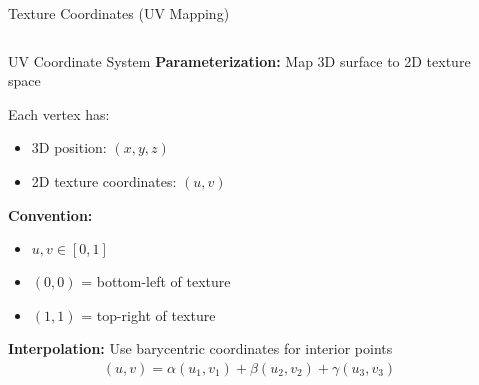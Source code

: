 \begin{frame}{Texture Coordinates (UV Mapping)}
  \begin{columns}
    \begin{column}{0.7\textwidth}
      \begin{mathbox}{UV Coordinate System}
        \footnotesize
        \textbf{Parameterization:} Map 3D surface to 2D texture space

        \vspace{0.2cm}
        Each vertex has:
        \begin{itemize}
          \item 3D position: $(x, y, z)$
          \item 2D texture coordinates: $(u, v)$
        \end{itemize}

        \vspace{0.2cm}
        \textbf{Convention:}
        \begin{itemize}
          \item $u, v \in [0, 1]$
          \item $(0, 0)$ = bottom-left of texture
          \item $(1, 1)$ = top-right of texture
        \end{itemize}

        \vspace{0.2cm}
        \textbf{Interpolation:} Use barycentric coordinates for interior points
        \begin{align*}
          (u, v) = \alpha (u_1, v_1) + \beta (u_2, v_2) + \gamma (u_3, v_3)
        \end{align*}
      \end{mathbox}
    \end{column}
    \begin{column}{0.3\textwidth}
      \centering
\end{column}
\end{columns}
\end{frame}
